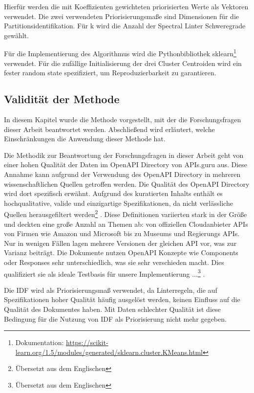 Hierfür werden die mit Koeffizienten gewichteten priorisierten Werte als Vektoren verwendet. Die zwei verwendeten Priorisierungsmaße sind Dimensionen für die Partitionsidentifikation. Für k wird die Anzahl der Spectral Linter Schweregrade gewählt.

Für die Implementierung des Algorithmus wird die Pythonbibliothek sklearn\footnote{Dokumentation: \href{https://scikit-learn.org/1.5/modules/generated/sklearn.cluster.KMeans.html}{https://scikit-learn.org/1.5/modules/generated/sklearn.cluster.KMeans.html}} verwendet. Für die zufällige Initialisierung der drei Cluster Centroiden wird ein fester random state spezifiziert, um Reproduzierbarkeit zu garantieren.


\subsection{Validität der Methode} \label{sec:validitätdermethode}
In diesem Kapitel wurde die Methode vorgestellt, mit der die Forschungsfragen dieser Arbeit beantwortet werden. Abschließend wird erläutert, welche Einschränkungen die Anwendung dieser Methode hat.

Die Methodik zur Beantwortung der Forschungsfragen in dieser Arbeit geht von einer hohen Qualität der Daten im OpenAPI Directory von APIs.guru aus. Diese Annahme kann aufgrund der Verwendung des OpenAPI Directory in mehreren wissenschaftlichen Quellen \parencite{bogner_restruler_2024} \parencite{serbout_apistic_2024} getroffen werden. Die Qualität des OpenAPI Directory wird dort spezifisch erwähnt. \glqq Aufgrund des kuratierten Inhalts enthält es hochqualitative, valide und einzigartige Spezifikationen, da nicht verlässliche Quellen herausgefiltert werden\grqq{}\footnote{Übersetzt aus dem Englischen} \parencite{serbout_apistic_2024}. \glqq Diese Definitionen variierten stark in der Größe und deckten eine große Anzahl an Themen ab: von offiziellen Cloudanbieter \acs{API}s von Firmen wie Amazon und Microsoft bis zu Museums und Regierungs \acs{API}s. Nur in wenigen Fällen lagen mehrere Versionen der gleichen \acs{API} vor, was zur Varianz beiträgt. Die Dokumente nutzen OpenAPI Konzepte wie Components oder Responses sehr unterschiedlich, was sie sehr verschieden macht. Dies qualifiziert sie als ideale Testbasis für unsere Implementierung ...\grqq{}\footnote{Übersetzt aus dem Englischen} \parencite{bogner_restruler_2024}.

Die \acl{IDF} wird als Priorisierungsmaß verwendet, da Linterregeln, die auf Spezifikationen hoher Qualität häufig ausgelöst werden, keinen Einfluss auf die Qualität des Dokumentes haben.
Mit Daten schlechter Qualität ist diese Bedingung für die Nutzung von \acs{IDF} als Priorisierung nicht mehr gegeben.


